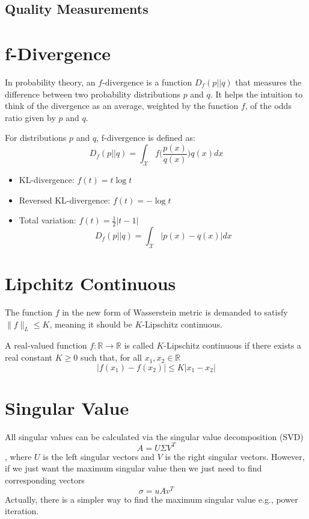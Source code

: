 \begin{appendices}
\subsection{Quality Measurements}

\section{f-Divergence}
In probability theory, an $f$-divergence is a function $D_{f}(p||q)$ that measures the difference between two probability distributions $p$ and $q$. It helps the intuition to think of the divergence as an average, weighted by the function $f$, of the odds ratio given by $p$ and $q$.

For distributions $p$ and $q$, f-divergence is defined as:
$$D_{f}(p||q) = \int_{\mathcal{X}}f\Bigg(\frac{p(x)}{q(x)}\Bigg)q(x)dx$$

\begin{itemize}
	\item KL-divergence: $f(t) = t\log t$
	\item Reversed KL-divergence: $f(t) = -\log t$
	\item Total variation: $f(t) = \frac{1}{2}|t-1|$
	$$D_{f}(p||q) = \int_{\mathcal{X}}|p(x)-q(x)|dx$$
\end{itemize}

\section{Lipchitz Continuous}
The function $f$ in the new form of Wasserstein metric is demanded to satisfy $\| f \|_L \leq K$, meaning it should be $K$-Lipschitz continuous. \citep{Lil2017}

A real-valued function $f: \mathbb{R} \rightarrow \mathbb{R}$ is called $K$-Lipschitz continuous if there exists a real constant $K\geq 0$ such that, for all $x_1, x_2 \in \mathbb{R}$
$$\lvert f(x_1) - f(x_2) \rvert \leq K \lvert x_1 - x_2 \rvert$$

\section{Singular Value}
All singular values can be calculated via the singular value decomposition (SVD)
$$A = U\Sigma V^T$$
, where $U$ is the left singular vectors and $V$ is the right singular vectors. However, if we just want the maximum singular value then we just need to find corresponding vectors
$$\sigma = uAv^T$$
Actually, there is a simpler way to find the maximum singular value e.g., power iteration. 



\end{appendices}
